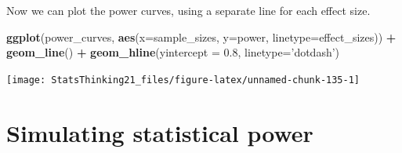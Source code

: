 \documentclass[12pt,]{book}
\newenvironment{Shaded}{\begin{snugshade}}{\end{snugshade}}
\newcommand{\CommentTok}[1]{\textcolor[rgb]{0.56,0.35,0.01}{\textit{#1}}}
\newcommand{\ControlFlowTok}[1]{\textcolor[rgb]{0.13,0.29,0.53}{\textbf{#1}}}
\newcommand{\DataTypeTok}[1]{\textcolor[rgb]{0.13,0.29,0.53}{#1}}
\newcommand{\FloatTok}[1]{\textcolor[rgb]{0.00,0.00,0.81}{#1}}
\newcommand{\KeywordTok}[1]{\textcolor[rgb]{0.13,0.29,0.53}{\textbf{#1}}}
\newcommand{\NormalTok}[1]{#1}
\newcommand{\OperatorTok}[1]{\textcolor[rgb]{0.81,0.36,0.00}{\textbf{#1}}}
\newcommand{\StringTok}[1]{\textcolor[rgb]{0.31,0.60,0.02}{#1}}
\begin{document}
\begin{Shaded}
\end{Shaded}

Now we can plot the power curves, using a separate line for each effect size.

\begin{Shaded}
\begin{Highlighting}[]
\KeywordTok{ggplot}\NormalTok{(power_curves, }
       \KeywordTok{aes}\NormalTok{(}\DataTypeTok{x=}\NormalTok{sample_sizes,}
           \DataTypeTok{y=}\NormalTok{power, }
           \DataTypeTok{linetype=}\NormalTok{effect_sizes)) }\OperatorTok{+}\StringTok{ }
\StringTok{  }\KeywordTok{geom_line}\NormalTok{() }\OperatorTok{+}\StringTok{ }
\StringTok{  }\KeywordTok{geom_hline}\NormalTok{(}\DataTypeTok{yintercept =} \FloatTok{0.8}\NormalTok{, }
             \DataTypeTok{linetype=}\StringTok{'dotdash'}\NormalTok{)}
\end{Highlighting}
\end{Shaded}

\texttt{[image: StatsThinking21\_files/figure-latex/unnamed-chunk-135-1]}

\hypertarget{simulating-statistical-power}{%
\section{Simulating statistical power}\label{simulating-statistical-power}}
\end{document}
